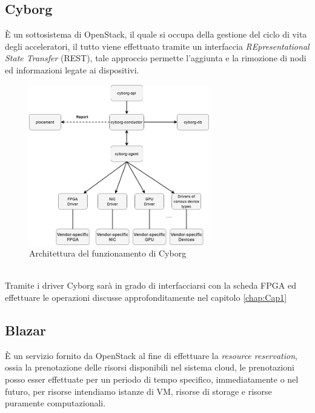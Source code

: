 \subsection{Cyborg}
È un sottosistema di OpenStack, il quale si occupa della gestione del ciclo di vita degli acceleratori, il tutto viene effettuato tramite un interfaccia \textit{REpresentational State Transfer} (REST), tale approccio permette l'aggiunta e la rimozione di nodi ed informazioni legate ai dispositivi.\cite{Cyborg}
\begin{figure}[h]
\centering
\includegraphics[width=0.7\textwidth]{images/cyborg-architecture.png}
\caption{Architettura del funzionamento di Cyborg\cite{Cyborg}}
\end{figure}\\
Tramite i driver Cyborg sarà in grado di interfacciarsi con la scheda FPGA ed effettuare le operazioni discusse approfonditamente nel capitolo \ref{chap:Cap1}
\subsection{Blazar}
\label{Blazar}
È un servizio fornito da OpenStack al fine di effettuare la \textit{resource reservation}, ossia la prenotazione delle risorsi disponibili nel sistema cloud, le prenotazioni posso esser effettuate per un periodo di tempo specifico, immediatamente o nel futuro, per risorse intendiamo istanze di VM, risorse di storage e risorse puramente computazionali.\cite{Blazar}
